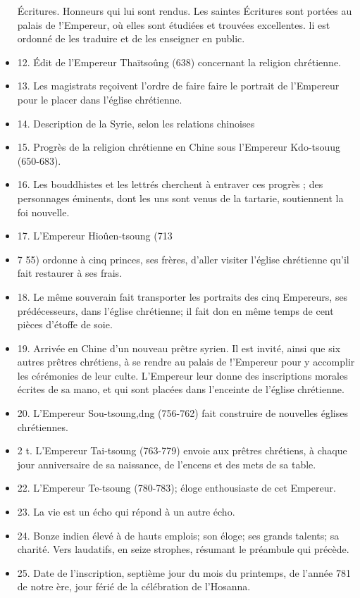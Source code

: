 \begin{itemize}
Écritures. Honneurs qui lui sont rendus. Les saintes Écritures sont portées au
palais de !'Empereur, où elles sont étudiées et trouvées excellentes. li est ordonné
de les traduire et de les enseigner en public. 
\item 12. Édit de l'Empereur Thaïtsoûng
(638) concernant la religion chrétienne. 
\item 13. Les magistrats reçoivent
l'ordre de faire faire le portrait de l'Empereur pour le placer dans l'église chrétienne.
\item14. Description de la Syrie, selon les relations chinoises
\item 15. Progrès
de la religion chrétienne en Chine sous l'Empereur Kdo-tsouug (650-683).
\item 16. Les bouddhistes et les lettrés cherchent à entraver ces progrès ; des personnages éminents, dont les uns sont venus de la tartarie, soutiennent la foi
nouvelle. 
\item 17. L'Empereur Hioûen-tsoung (713\item7 55) ordonne à cinq princes,
ses frères, d'aller visiter l'église chrétienne qu'il fait restaurer à ses frais.
\item 18. Le
même souverain fait transporter les portraits des cinq Empereurs, ses prédécesseurs,
dans l'église chrétienne; il fait don en même temps de cent pièces d'étoffe
de soie. 
\item 19. Arrivée en Chine d'un nouveau prêtre syrien. Il est invité, ainsi
que six autres prêtres chrétiens, à se rendre au palais de !'Empereur pour y accomplir les cérémonies de leur culte. L'Empereur leur donne des inscriptions morales
écrites de sa mano, et qui sont placées dans l'enceinte de l'église chrétienne.

\item 20. L'Empereur Sou-tsoung,dng (756-762) fait construire de nouvelles églises chrétiennes. 
\item 2 t. L'Empereur Tai-tsoung (763-779) envoie aux prêtres chrétiens,
à chaque jour anniversaire de sa naissance, de l'encens et des mets de sa table.
\item 22. L'Empereur Te-tsoung (780-783); éloge enthousiaste de cet Empereur.
\item 23. La vie est un écho qui répond à un autre écho. 
\item 24. Bonze indien élevé
à de hauts emplois; son éloge; ses grands talents; sa charité. Vers laudatifs,
en seize strophes, résumant le préambule qui précède. 
\item 25. Date de l'inscription,
septième jour du mois du printemps, de l'année 781 de notre ère, jour férié
de la célébration de l'Hosanna.
\end{itemize}


